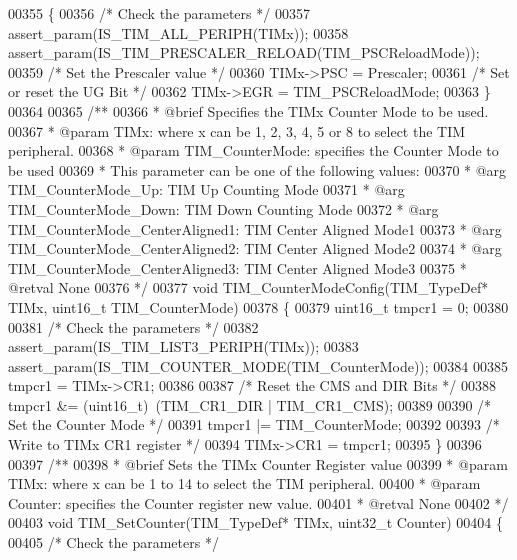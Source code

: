 \begin{DoxyCode}
00355 \{
00356   \textcolor{comment}{/* Check the parameters */}
00357   assert_param(IS\_TIM\_ALL\_PERIPH(TIMx));
00358   assert_param(IS\_TIM\_PRESCALER\_RELOAD(TIM\_PSCReloadMode));
00359   \textcolor{comment}{/* Set the Prescaler value */}
00360   TIMx->PSC = Prescaler;
00361   \textcolor{comment}{/* Set or reset the UG Bit */}
00362   TIMx->EGR = TIM\_PSCReloadMode;
00363 \}
00364 
00365 \textcolor{comment}{/**}
00366 \textcolor{comment}{  * @brief  Specifies the TIMx Counter Mode to be used.}
00367 \textcolor{comment}{  * @param  TIMx: where x can be  1, 2, 3, 4, 5 or 8 to select the TIM peripheral.}
00368 \textcolor{comment}{  * @param  TIM\_CounterMode: specifies the Counter Mode to be used}
00369 \textcolor{comment}{  *          This parameter can be one of the following values:}
00370 \textcolor{comment}{  *            @arg TIM\_CounterMode\_Up: TIM Up Counting Mode}
00371 \textcolor{comment}{  *            @arg TIM\_CounterMode\_Down: TIM Down Counting Mode}
00372 \textcolor{comment}{  *            @arg TIM\_CounterMode\_CenterAligned1: TIM Center Aligned Mode1}
00373 \textcolor{comment}{  *            @arg TIM\_CounterMode\_CenterAligned2: TIM Center Aligned Mode2}
00374 \textcolor{comment}{  *            @arg TIM\_CounterMode\_CenterAligned3: TIM Center Aligned Mode3}
00375 \textcolor{comment}{  * @retval None}
00376 \textcolor{comment}{  */}
00377 \textcolor{keywordtype}{void} TIM_CounterModeConfig(TIM\_TypeDef* TIMx, uint16\_t TIM\_CounterMode)
00378 \{
00379   uint16\_t tmpcr1 = 0;
00380 
00381   \textcolor{comment}{/* Check the parameters */}
00382   assert_param(IS\_TIM\_LIST3\_PERIPH(TIMx));
00383   assert_param(IS\_TIM\_COUNTER\_MODE(TIM\_CounterMode));
00384 
00385   tmpcr1 = TIMx->CR1;
00386 
00387   \textcolor{comment}{/* Reset the CMS and DIR Bits */}
00388   tmpcr1 &= (uint16\_t)~(TIM_CR1_DIR | TIM_CR1_CMS);
00389 
00390   \textcolor{comment}{/* Set the Counter Mode */}
00391   tmpcr1 |= TIM\_CounterMode;
00392 
00393   \textcolor{comment}{/* Write to TIMx CR1 register */}
00394   TIMx->CR1 = tmpcr1;
00395 \}
00396 
00397 \textcolor{comment}{/**}
00398 \textcolor{comment}{  * @brief  Sets the TIMx Counter Register value}
00399 \textcolor{comment}{  * @param  TIMx: where x can be 1 to 14 to select the TIM peripheral.}
00400 \textcolor{comment}{  * @param  Counter: specifies the Counter register new value.}
00401 \textcolor{comment}{  * @retval None}
00402 \textcolor{comment}{  */}
00403 \textcolor{keywordtype}{void} TIM_SetCounter(TIM\_TypeDef* TIMx, uint32\_t Counter)
00404 \{
00405   \textcolor{comment}{/* Check the parameters */}

\end{DoxyCode}
